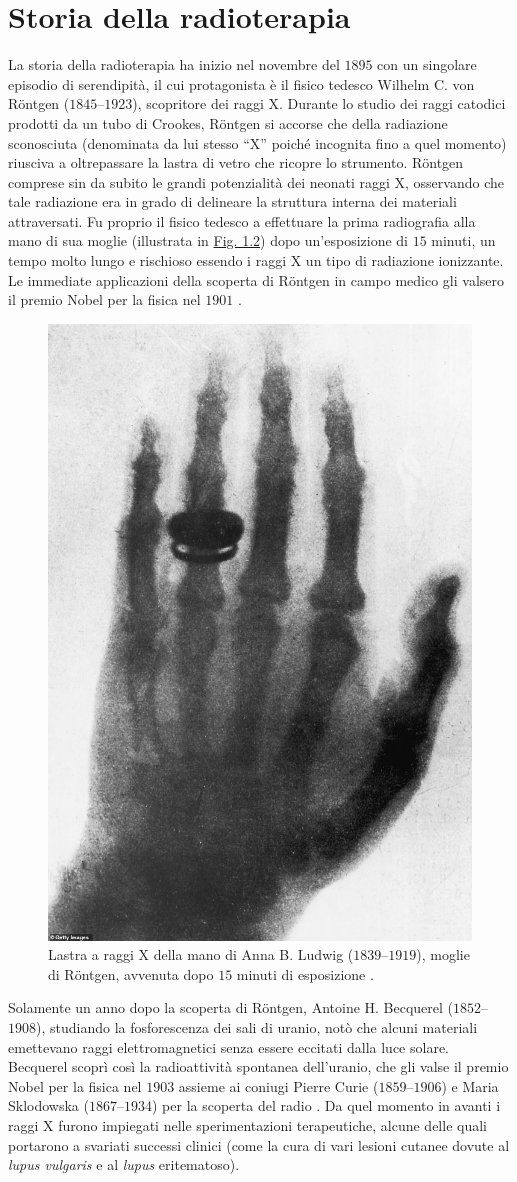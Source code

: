 \documentclass[12pt,a4paper,twoside]{report}
\begin{document}
	\section{Storia della radioterapia}
	La storia della radioterapia ha inizio nel novembre del $1895$ con un singolare episodio di serendipità, il cui protagonista è il fisico tedesco Wilhelm C. von Röntgen ($1845$--$1923$), scopritore dei raggi X. Durante lo studio dei raggi catodici prodotti da un tubo di Crookes, Röntgen si accorse che della radiazione sconosciuta (denominata da lui stesso ``X'' poiché incognita fino a quel momento) riusciva a oltrepassare la lastra di vetro che ricopre lo strumento. Röntgen comprese sin da subito le grandi potenzialità dei neonati raggi X, osservando che tale radiazione era in grado di delineare la struttura interna dei materiali attraversati. Fu proprio il fisico tedesco a effettuare la prima radiografia alla mano di sua moglie (illustrata in \hyperref[fig:rongten]{Fig. 1.2}) dopo un'esposizione di $15$ minuti, un tempo molto lungo e rischioso essendo i raggi X un tipo di radiazione ionizzante. Le immediate applicazioni della scoperta di Röntgen in campo medico gli valsero il premio Nobel per la fisica nel $1901$ \cite{rontgen}.
	\begin{figure}[H]
		\centering
		\includegraphics[width=0.4\linewidth]{rongten.jpg}
		\caption{Lastra a raggi X della mano di Anna B. Ludwig ($1839$--$1919$), moglie di Röntgen, avvenuta dopo $15$ minuti di esposizione \cite{hand_rongt_wife}.}
		\label{fig:rongten}
	\end{figure}
	Solamente un anno dopo la scoperta di Röntgen, Antoine H. Becquerel ($1852$--$1908$), studiando la fosforescenza dei sali di uranio, notò che alcuni materiali emettevano raggi elettromagnetici senza essere eccitati dalla luce solare. Becquerel scoprì così la radioattività spontanea dell'uranio, che gli valse il premio Nobel per la fisica nel $1903$ assieme ai coniugi Pierre Curie ($1859$--$1906$) e Maria Sklodowska ($1867$--$1934$) per la scoperta del radio . Da quel momento in avanti i raggi X furono impiegati nelle sperimentazioni terapeutiche, alcune delle quali portarono a svariati successi clinici (come la cura di vari lesioni cutanee dovute al \textit{lupus vulgaris} e al \textit{lupus} eritematoso).
	
\end{document}
